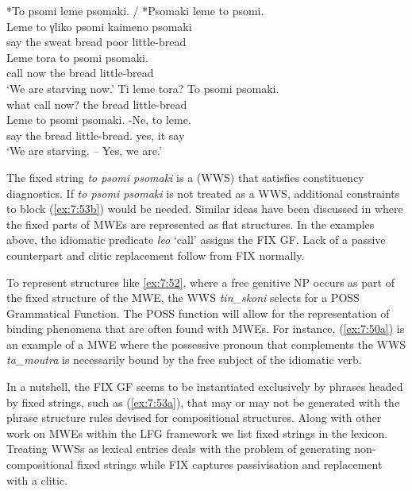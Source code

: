 \documentclass[output=paper]{langsci/langscibook}
\begin{document}
\ex \label{ex:7:53b}
*To psomi leme psomaki. / *Psomaki leme to psomi.\\
\ex \label{ex:7:53c}
\gll *Leme to γliko psomi kaimeno psomaki \\
                  say the sweat bread poor little-bread\\
\ex \label{ex:7:53d}
\gll  Leme tora to psomi psomaki.\\
               call now the bread little-bread\\
\glt           `We are starving now.'
\ex \label{ex:7:53e}
\gll  Ti leme tora? To psomi psomaki.\\
                 what  call now? the bread little-bread\\
\ex \label{ex:7:53f}
\gll   Leme to psomi psomaki. -Ne, to leme.\\
         say the bread little-bread. yes,  it say\\
\glt       ‘We are starving. – Yes, we are.’
\z
\z

  The fixed string {\normalfont \itshape to psomi psomaki} is a  (WWS) \citep{Sag:2002} that satisfies constituency diagnostics.  If  {\normalfont \itshape to psomi psomaki}  is not treated as a WWS, additional constraints to block (\ref{ex:7:53b}) would  be needed. Similar ideas have been discussed in \citet{green2013} where the fixed parts of MWEs are represented as flat structures. In the examples above, the idiomatic predicate {\normalfont \itshape leo} `call'  assigns the FIX GF. Lack of a passive counterpart and clitic replacement follow from FIX normally. 
  
  To represent structures like \ref{ex:7:52}, where a free genitive NP occurs as part of the fixed structure of the MWE, the WWS {\normalfont \itshape tin\_skoni} selects for a POSS Grammatical Function. The POSS function will allow for the representation of binding phenomena that are often found with MWEs. For instance, (\ref{ex:7:50a}) is an example of a MWE where the possessive pronoun that complements the WWS  {\normalfont \itshape ta\_moutra} is necessarily bound by the free subject of the idiomatic verb. 

In a nutshell, the FIX GF seems to be instantiated exclusively by phrases headed by fixed strings, such as (\ref{ex:7:53a}), that may or may not be generated   with the phrase structure rules devised for compositional structures. Along with other work on MWEs within the LFG framework \citet{attia2006} we list fixed strings in the lexicon.  Treating WWSs as lexical entries deals with the problem of generating  non-compositional fixed strings while FIX captures passivisation and replacement with a clitic. 
\end{document}
